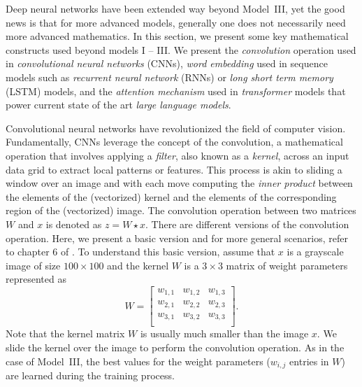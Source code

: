Deep neural networks have been extended way beyond Model~III, yet the good news is that for more advanced models, generally one does not necessarily need more advanced mathematics. In this section, we present some key mathematical constructs used beyond models I -- III. We present  the {\em convolution} operation used in {\em convolutional neural networks} (CNNs), {\em word embedding} used in sequence models such as {\em recurrent neural network} (RNNs) or {\em long short term memory} (LSTM) models, and the {\em attention mechanism} used in {\em transformer} models that power current state of the art {\em large language models}.

Convolutional neural networks have revolutionized the field of computer vision. Fundamentally, CNNs leverage the concept of the convolution, a mathematical operation that involves applying a {\em filter}, also known as a {\em kernel}, across an input data grid to extract local patterns or features. This process is akin to sliding a window over an image and with each move computing the {\em inner product} between the elements of the (vectorized) kernel and the elements of the corresponding region of the (vectorized) image. The convolution operation between two matrices $W$ and $x$ is denoted as $z = W \star x$. There are different versions of the convolution operation. Here, we present a basic version and for more general scenarios, refer to chapter 6 of  \cite{LiquetMokaNazarathy2024DeepLearning}. To understand this basic version, assume that $x$ is a grayscale image of size $100 \times 100$ and the kernel $W$ is a $3\times 3$ matrix of weight parameters represented as
%
\begin{equation}
\label{eq:conv-kernel}
W = 
\begin{bmatrix}
    w_{1,1} & w_{1,2} & w_{1,3} \\
    w_{2,1} & w_{2,2} & w_{2,3} \\
    w_{3,1} & w_{3,2} & w_{3,3} \\
\end{bmatrix}.
\end{equation}
%
Note that the kernel matrix $W$ is usually much smaller than the image $x$. We slide the kernel over the image to perform the convolution operation. As in the case of Model~III, the best values for the weight parameters ($w_{i, j}$ entries in $W$) are learned during the training process. 

